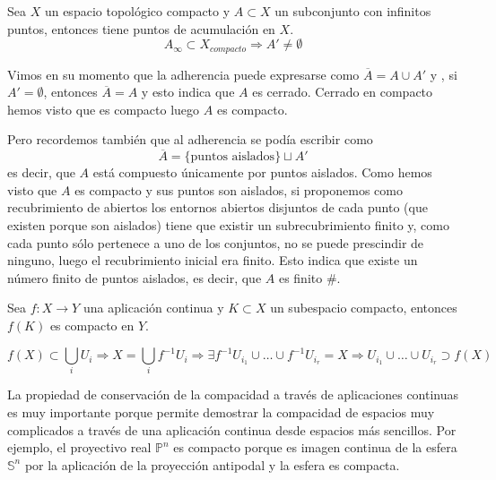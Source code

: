 \begin{prop}[Mantra 2]
Sea $X$ un espacio topológico compacto y $A\subset X$ un subconjunto con infinitos puntos, entonces tiene puntos de acumulación en $X$.
\[
A_\infty \subset X_{compacto} \Rightarrow A' \neq \emptyset
\]
\end{prop}
\begin{demo}
Vimos en su momento que la adherencia puede expresarse como $\overline{A} = A \cup A'$ y , si $A' = \emptyset$, entonces $\overline{A} = A$ y esto indica que $A$ es cerrado. Cerrado en compacto hemos visto que es compacto luego $A$ es compacto.

Pero recordemos también que al adherencia se podía escribir como
\[
\overline{A} = \{\text{puntos aislados}\} \sqcup A'
\]
es decir, que $A$ está compuesto únicamente por puntos aislados. Como hemos visto que $A$ es compacto y sus puntos son aislados, si proponemos como recubrimiento de abiertos los entornos abiertos disjuntos de cada punto (que existen porque son aislados) tiene que existir un subrecubrimiento finito y, como cada punto sólo pertenece a uno de los conjuntos, no se puede prescindir de ninguno, luego el recubrimiento inicial era finito. Esto indica que existe un número finito de puntos aislados, es decir, que $A$ es finito \#.
\end{demo}

\begin{prop}[Mantra 3]
Sea $f:X\rightarrow Y$ una aplicación continua y $K\subset X$ un subespacio compacto, entonces $f(K)$ es compacto en $Y$.
\end{prop}
\begin{demo}
\[
f\left( X \right) \subset \bigcup_{i} U_i \Rightarrow X = \bigcup_{i} f^{-1} U_i \Rightarrow \exists f^{-1}U_{i_1} \cup \ldots \cup f^{-1}U_{i_r} = X \Rightarrow U_{i_1} \cup \ldots \cup U_{i_r} \supset f\left( X \right)
\]
\end{demo}

\begin{obs}
La propiedad de conservación de la compacidad a través de aplicaciones continuas es muy importante porque permite demostrar la compacidad de espacios muy complicados a través de una aplicación continua desde espacios más sencillos. Por ejemplo, el proyectivo real $\mathbb{P}^n$ es compacto porque es imagen continua de la esfera $\mathbb{S}^n$ por la aplicación de la proyección antipodal y la esfera es compacta.
\end{obs}

